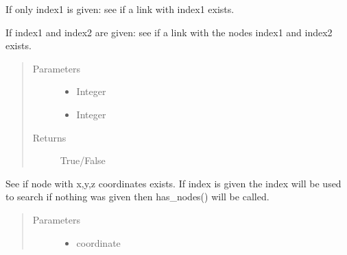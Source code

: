 \documentclass[letterpaper,10pt,english]{sphinxmanual}
\begin{document}
\begin{fulllineitems}
\begin{fulllineitems}
\end{fulllineitems}


\begin{fulllineitems}
\label{\detokenize{api:beamon.database.Database.contains_link}}
If only index1 is given: see if a link with index1 exists.

If index1 and index2 are given: see if a link with the nodes index1 and index2 exists.
\begin{quote}\begin{description}
\item[{Parameters}] \leavevmode\begin{itemize}
\item {} 
 \textendash{} Integer

\item {} 
 \textendash{} Integer

\end{itemize}

\item[{Returns}] \leavevmode
True/False

\end{description}\end{quote}

\end{fulllineitems}


\begin{fulllineitems}
\label{\detokenize{api:beamon.database.Database.contains_node}}
See if node with x,y,z coordinates exists. If index is given the index will be used to search
if nothing was given then has\_nodes() will be called.
\begin{quote}\begin{description}
\item[{Parameters}] \leavevmode\begin{itemize}
\item {} 
 \textendash{} coordinate


\end{itemize}
\end{description}
\end{quote}
\end{fulllineitems}
\end{fulllineitems}
\end{document}
